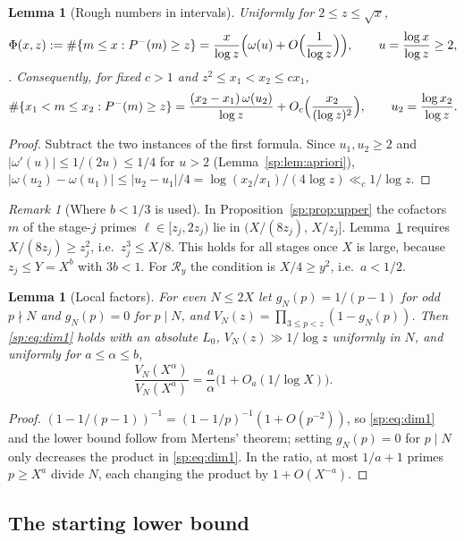 \documentclass[final,11pt]{elsarticle}
\newtheorem{lemma}[theorem]{Lemma}
\theoremstyle{definition}
\theoremstyle{remark}
\newtheorem{remark}[theorem]{Remark}
\newcommand{\R}{\mathcal R}
\numberwithin{equation}{section}
\begin{document}
\begin{lemma}[Rough numbers in intervals]\label{sp:lem:buchstab}
Uniformly for $2\le z\le\sqrt x$,
\[
 \Phi(x,z):=\#\{m\le x:P^-(m)\ge z\}=\frac{x}{\log z}\Bigl(\omega(u)+O\Bigl(\frac1{\log z}\Bigr)\Bigr),
 \qquad u=\frac{\log x}{\log z}\ge2,
\]
\cite[Theorem~III.6.4]{Tenenbaum}. Consequently, for fixed $c>1$ and
$z^2\le x_1<x_2\le cx_1$,
\[
 \#\{x_1<m\le x_2:P^-(m)\ge z\}=\frac{(x_2-x_1)\,\omega(u_2)}{\log z}+O_c\Bigl(\frac{x_2}{(\log z)^2}\Bigr),
 \qquad u_2=\frac{\log x_2}{\log z}.
\]
\end{lemma}

\begin{proof}
Subtract the two instances of the first formula. Since $u_1,u_2\ge2$ and
$|\omega'(u)|\le1/(2u)\le1/4$ for $u>2$ (Lemma~\ref{sp:lem:apriori}),
$|\omega(u_2)-\omega(u_1)|\le|u_2-u_1|/4=\log(x_2/x_1)/(4\log z)\ll_c1/\log z$.
\end{proof}

\begin{remark}[Where $b<1/3$ is used]
In Proposition~\ref{sp:prop:upper} the cofactors $m$ of the stage-$j$ primes
$\ell\in[z_j,2z_j)$ lie in $(X/(8z_j),\,X/z_j]$. Lemma~\ref{sp:lem:buchstab}
requires $X/(8z_j)\ge z_j^2$, i.e.\ $z_j^3\le X/8$. This holds for all stages
once $X$ is large, because $z_j\le Y=X^b$ with $3b<1$. For $\R_y$ the condition
is $X/4\ge y^2$, i.e.\ $a<1/2$.
\end{remark}

\begin{lemma}[Local factors]\label{sp:lem:local}
For even $N\le2X$ let $g_N(p)=1/(p-1)$ for odd $p\nmid N$ and $g_N(p)=0$ for
$p\mid N$, and $V_N(z)=\prod_{3\le p<z}(1-g_N(p))$. Then \eqref{sp:eq:dim1} holds
with an absolute $L_0$, $V_N(z)\gg1/\log z$ uniformly in $N$, and uniformly for
$a\le\alpha\le b$,
\[
 \frac{V_N(X^\alpha)}{V_N(X^a)}=\frac a\alpha\bigl(1+O_a(1/\log X)\bigr).
\]
\end{lemma}

\begin{proof}
$(1-1/(p-1))^{-1}=(1-1/p)^{-1}(1+O(p^{-2}))$, so \eqref{sp:eq:dim1} and the lower
bound follow from Mertens' theorem; setting $g_N(p)=0$ for $p\mid N$ only
decreases the product in \eqref{sp:eq:dim1}. In the ratio, at most $1/a+1$ primes
$p\ge X^a$ divide $N$, each changing the product by $1+O(X^{-a})$.
\end{proof}

\subsection{The starting lower bound}\label{sp:sec:lower}
\end{document}
